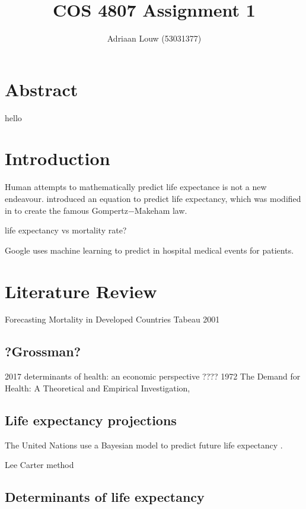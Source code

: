 \documentclass[10pt,a4paper]{article}
\title{COS 4807 Assignment 1}
\author{Adriaan Louw (53031377)}
\begin{document}
\maketitle

\tableofcontents

\listoffigures

\listoftables


\section{Abstract}
hello
\section{Introduction}

Human attempts to mathematically predict life expectance is not a new endeavour. \cite{Gompertz} introduced an equation to predict life expectancy, which was modified in \cite{Makeham1860} to create the famous Gompertz$-$Makeham law.

life expectancy vs mortality rate?

\cite{Rajkomar2018} Google uses machine learning to predict in hospital medical events for patients. 

\section{Literature Review}

Forecasting Mortality in Developed Countries Tabeau 2001

\subsection{?Grossman?}
2017 determinants of health: an economic perspective  ????
1972 The Demand for Health: A Theoretical and Empirical Investigation,

\cite{Grossman2000}

\subsection{Life expectancy projections}

The United Nations use a Bayesian model to predict future life expectancy \citep{Raftery2014}.

Lee Carter method \cite{Shang2011}

\cite{Bongaarts2005}

\subsection{Determinants of life expectancy}
\end{document}
